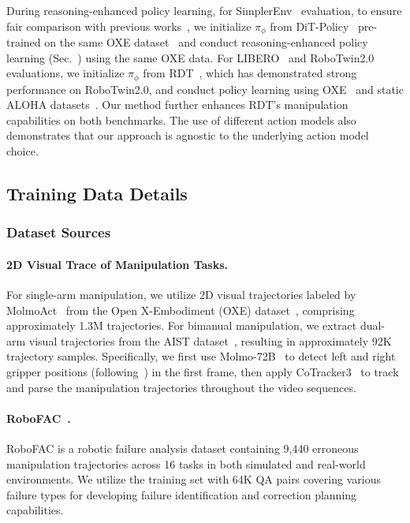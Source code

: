 During reasoning-enhanced policy learning, for SimplerEnv~\cite{li24simpler} evaluation, to ensure fair comparison with previous works~\cite{kim24openvla, lee2025molmoact}, we initialize $\pi_\phi$ from DiT-Policy~\cite{chi2023diffusion} pre-trained on the same OXE dataset~\cite{o2024open, kim24openvla} and conduct reasoning-enhanced policy learning (Sec.~) using the same OXE data. For LIBERO~\cite{liu2023libero} and RoboTwin2.0~\cite{chen2025robotwin2} evaluations, we initialize $\pi_\phi$ from RDT~\cite{liu2024rdt}, which has demonstrated strong performance on RoboTwin2.0, and conduct policy learning using OXE~\cite{o2024open} and static ALOHA datasets~\cite{shi2023waypoint, zhao2023learning}. Our method further enhances RDT's manipulation capabilities on both benchmarks. The use of different action models also demonstrates that our approach is agnostic to the underlying action model choice.


\subsection{Training Data Details}

\subsubsection{Dataset Sources}


\paragraph{2D Visual Trace of Manipulation Tasks.} For single-arm manipulation, we utilize 2D visual trajectories labeled by MolmoAct~\cite{lee2025molmoact} from the Open X-Embodiment (OXE) dataset~\cite{o2024open}, comprising approximately 1.3M trajectories. For bimanual manipulation, we extract dual-arm visual trajectories from the AIST dataset~\cite{aist2025aist}, resulting in approximately 92K trajectory samples. Specifically, we first use Molmo-72B~\cite{deitke2024molmo} to detect left and right gripper positions (following~\cite{lee2025molmoact}) in the first frame, then apply CoTracker3~\cite{karaev2025cotracker3} to track and parse the manipulation trajectories throughout the video sequences.

\paragraph{RoboFAC~\cite{lu2025robofac}.} RoboFAC is a robotic failure analysis dataset containing 9,440 erroneous manipulation trajectories across 16 tasks in both simulated and real-world environments. We utilize the training set with 64K QA pairs covering various failure types for developing failure identification and correction planning capabilities.

